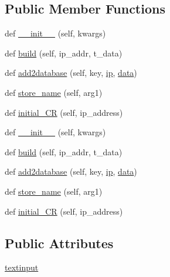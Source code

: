 \subsection*{Public Member Functions}
\begin{DoxyCompactItemize}
\item 
def \hyperlink{classTestingGUI_1_1addingLight_ace8a7edfba84662f465ad3b6cc979ba0}{\+\_\+\+\_\+init\+\_\+\+\_\+} (self, kwargs)
\item 
def \hyperlink{classTestingGUI_1_1addingLight_a09539dcb1cdfd504a9e75937bf380284}{build} (self, ip\+\_\+addr, t\+\_\+data)
\item 
def \hyperlink{classTestingGUI_1_1addingLight_a4ce96f3dc2a6a06664d0c3b724dc5e8a}{add2database} (self, key, \hyperlink{classTestingGUI_1_1addingLight_afc65af761152e3325cc2cc225c9e8f7d}{ip}, \hyperlink{classTestingGUI_1_1addingLight_a763aa941465f77b12ffea9edba79c399}{data})
\item 
def \hyperlink{classTestingGUI_1_1addingLight_adec18b9e79375b11c280acdd672ea15a}{store\+\_\+name} (self, arg1)
\item 
def \hyperlink{classTestingGUI_1_1addingLight_a5804dc70f75e50f75694b529206dabf7}{initial\+\_\+\+CR} (self, ip\+\_\+address)
\item 
def \hyperlink{classTestingGUI_1_1addingLight_ace8a7edfba84662f465ad3b6cc979ba0}{\+\_\+\+\_\+init\+\_\+\+\_\+} (self, kwargs)
\item 
def \hyperlink{classTestingGUI_1_1addingLight_a09539dcb1cdfd504a9e75937bf380284}{build} (self, ip\+\_\+addr, t\+\_\+data)
\item 
def \hyperlink{classTestingGUI_1_1addingLight_a4ce96f3dc2a6a06664d0c3b724dc5e8a}{add2database} (self, key, \hyperlink{classTestingGUI_1_1addingLight_afc65af761152e3325cc2cc225c9e8f7d}{ip}, \hyperlink{classTestingGUI_1_1addingLight_a763aa941465f77b12ffea9edba79c399}{data})
\item 
def \hyperlink{classTestingGUI_1_1addingLight_adec18b9e79375b11c280acdd672ea15a}{store\+\_\+name} (self, arg1)
\item 
def \hyperlink{classTestingGUI_1_1addingLight_a5804dc70f75e50f75694b529206dabf7}{initial\+\_\+\+CR} (self, ip\+\_\+address)
\end{DoxyCompactItemize}
\subsection*{Public Attributes}
\begin{DoxyCompactItemize}
\item 
\hyperlink{classTestingGUI_1_1addingLight_a019891e6b3abbd0964de1e86a6a899e1}{textinput}
\end{DoxyCompactItemize}
